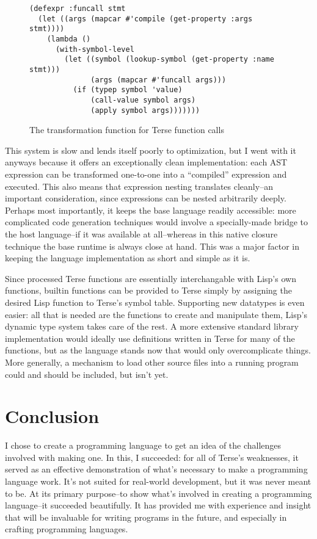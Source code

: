 \documentclass[12pt]{report}
\begin{document}
\begin{figure}
\begin{verbatim}
(defexpr :funcall stmt
  (let ((args (mapcar #'compile (get-property :args stmt))))
    (lambda ()
      (with-symbol-level
        (let ((symbol (lookup-symbol (get-property :name stmt)))
              (args (mapcar #'funcall args)))
          (if (typep symbol 'value)
              (call-value symbol args)
              (apply symbol args)))))))
\end{verbatim}
\caption{The transformation function for Terse function calls}
\end{figure}

This system is slow and lends itself poorly to optimization, but I
went with it anyways because it offers an exceptionally clean
implementation: each AST expression can be transformed one-to-one into
a ``compiled'' expression and executed. This also means that
expression nesting translates cleanly--an important consideration,
since expressions can be nested arbitrarily deeply. Perhaps most
importantly, it keeps the base language readily accessible: more
complicated code generation techniques would involve a specially-made
bridge to the host language--if it was available at all--whereas in
this native closure technique the base runtime is always close at
hand. This was a major factor in keeping the language implementation
as short and simple as it is.

Since processed Terse functions are essentially interchangable with
Lisp's own functions, builtin functions can be provided to Terse
simply by assigning the desired Lisp function to Terse's symbol
table. Supporting new datatypes is even easier: all that is needed are
the functions to create and manipulate them, Lisp's dynamic type
system takes care of the rest. A more extensive standard library
implementation would ideally use definitions written in Terse for many
of the functions, but as the language stands now that would only
overcomplicate things. More generally, a mechanism to load other
source files into a running program could and should be included, but
isn't yet.

\section*{Conclusion}

I chose to create a programming language to get an idea of the
challenges involved with making one. In this, I succeeded: for all of
Terse's weaknesses, it served as an effective demonstration of what's
necessary to make a programming language work. It's not suited for
real-world development, but it was never meant to be. At its primary
purpose--to show what's involved in creating a programming
language--it succeeded beautifully. It has provided me with experience
and insight that will be invaluable for writing programs in the
future, and especially in crafting programming languages.
\end{document}
